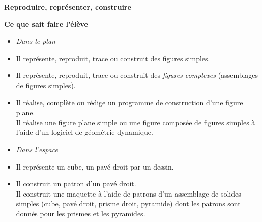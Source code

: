 \documentclass[10pt]{article}
\newcommand{\RR}{\begin{tikzpicture} \draw[Carmin,fill=Carmin] (0,0) circle (0.06); \end{tikzpicture}}
\newcommand{\souscompetence}[1]{\par\color{Carmin}\textbf{\large{#1}}\color{black}\vspace{1em}}
\newenvironment{savoireleves}{%
    \renewcommand{\labelitemi}{\RR}%
    \color{black}%
    \par\textbf{Ce que sait faire l'élève}
    \begin{itemize}
    \setlength{\itemsep}{-0.2em}%
}{
    \end{itemize}
}
\begin{document}
    \souscompetence{Reproduire, représenter, construire}
    \begin{savoireleves}
        \item[] \textit{Dans le plan}
        \item Il représente, reproduit, trace ou construit des figures simples.
        \item Il représente, reproduit, trace ou construit des \textit{figures complexes} (assemblages de figures simples).
        \item Il réalise, complète ou rédige un programme de construction d’une figure plane.\\
        Il réalise une figure plane simple ou une figure composée de figures simples à l’aide d’un logiciel de géométrie dynamique.
        \item[] \textit{Dans l'espace}
        \item Il représente un cube, un pavé droit par un dessin.
        \item Il construit un patron d’un pavé droit.\\
        Il construit une maquette à l’aide de patrons d’un assemblage de solides simples (cube, pavé droit, prisme droit, pyramide) dont les patrons sont donnés pour les prismes et les pyramides.
    \end{savoireleves}
\end{document}

